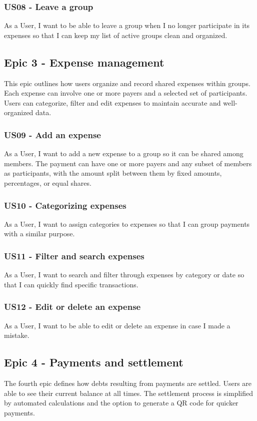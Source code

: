 \documentclass{ctuthesis}
\begin{document}
\subsubsection{US08 - Leave a group}
As a User, I want to be able to leave a group when I no longer participate in its expenses so that I can keep my list of active groups clean and organized.

\subsection{Epic 3 - Expense management}
This epic outlines how users organize and record shared expenses within groups. Each expense can involve one or more payers and a selected set of participants. Users can categorize, filter and edit expenses to maintain accurate and well-organized data.

\subsubsection{US09 - Add an expense}
As a User, I want to add a new expense to a group so it can be shared among members. The payment can have one or more payers and any subset of members as participants, with the amount split between them by fixed amounts, percentages, or equal shares.

\subsubsection{US10 - Categorizing expenses}
As a User, I want to assign categories to expenses so that I can group payments with a similar purpose. 

\subsubsection{US11 - Filter and search expenses}
As a User, I want to search and filter through expenses by category or date so that I can quickly find specific transactions. 

\subsubsection{US12 - Edit or delete an expense}
As a User, I want to be able to edit or delete an expense in case I made a mistake.

\subsection{Epic 4 - Payments and settlement}
The fourth epic defines how debts resulting from payments are settled. Users are able to see their current balance at all times. The settlement process is simplified by automated calculations and the option to generate a QR code for quicker payments.
\end{document}
